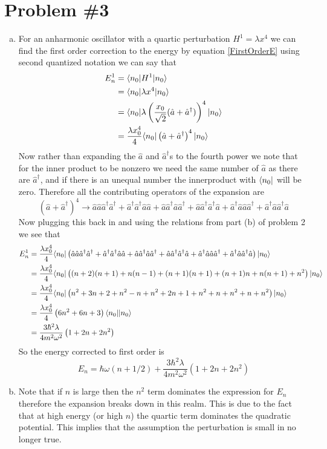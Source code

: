 \documentclass[11pt]{article}
\numberwithin{equation}{section}
\begin{document}
\section{Problem \#3}
\begin{enumerate}[(a)]
\item
For an anharmonic oscillator with a quartic perturbation $H^1 = \lambda x^4$ we can find the first order correction to the energy by equation \ref{FirstOrderE} using second quantized notation we can say that
\begin{align*}
E_n^1 &= \langle{n_0}|H^1|{n_0}\rangle\\
&= \langle{n_0}|\lambda x^4|{n_0}\rangle\\
&= \langle{n_0}|\lambda\left(\frac{x_0}{\sqrt{2}}(\hat{a}+\hat{a}^{\dagger})\right)^4|{n_0}\rangle\\
&= \frac{\lambda x_0^4}{4}\langle{n_0}|\left(\hat{a}+\hat{a}^{\dagger}\right)^4|{n_0}\rangle
\end{align*}
Now rather than expanding the $\hat{a}$ and $\hat{a}^{\dagger}$s to the fourth power we note that for the inner product to be nonzero we need the same number of $\hat{a}$ as there are $\hat{a}^{\dagger}$, and if there is an unequal number the innerproduct with $\langle{n_0}|$ will be zero. Therefore all the contributing operators of the expansion are
$$\left(\hat{a}+\hat{a}^{\dagger}\right)^4 \rightarrow \hat{a}\hat{a}\hat{a}^{\dagger}\hat{a}^{\dagger} + \hat{a}^{\dagger}\hat{a}^{\dagger}\hat{a}\hat{a} + \hat{a}\hat{a}^{\dagger}\hat{a}\hat{a}^{\dagger} + \hat{a}\hat{a}^{\dagger}\hat{a}^{\dagger}\hat{a} + \hat{a}^{\dagger}\hat{a}\hat{a}\hat{a}^{\dagger} + \hat{a}^{\dagger}\hat{a}\hat{a}^{\dagger}\hat{a}$$
Now plugging this back in and using the relations from part (b) of problem 2 we see that
\begin{align*}
E_n^1 &= \frac{\lambda x_0^4}{4}\langle{n_0}|\left(\hat{a}\hat{a}\hat{a}^{\dagger}\hat{a}^{\dagger} + \hat{a}^{\dagger}\hat{a}^{\dagger}\hat{a}\hat{a} + \hat{a}\hat{a}^{\dagger}\hat{a}\hat{a}^{\dagger} + \hat{a}\hat{a}^{\dagger}\hat{a}^{\dagger}\hat{a} + \hat{a}^{\dagger}\hat{a}\hat{a}\hat{a}^{\dagger} + \hat{a}^{\dagger}\hat{a}\hat{a}^{\dagger}\hat{a}\right)|{n_0}\rangle\\
&= \frac{\lambda x_0^4}{4}\langle{n_0}|\left((n+2)(n+1)+n(n-1)+(n+1)(n+1)+(n+1)n+n(n+1)+n^2\right)|{n_0}\rangle\\
&= \frac{\lambda x_0^4}{4}\langle{n_0}|\left(n^2+3n+2+n^2-n+n^2+2n+1+n^2+n+n^2+n+n^2\right)|{n_0}\rangle\\
&= \frac{\lambda x_0^4}{4}\left(6n^2+6n+3\right)\langle{n_0}||{n_0}\rangle\\
&= \frac{3\hbar^2\lambda}{4m^2\omega^2}\left(1+2n+2n^2\right)
\end{align*}
So the energy corrected to first order is
$$E_n = \hbar\omega(n+1/2) + \frac{3\hbar^2\lambda}{4m^2\omega^2}\left(1+2n+2n^2\right)$$

\item
Note that if $n$ is large then the $n^2$ term dominates the expression for $E_n$ therefore the expansion breaks down in this realm. This is due to the fact that at high energy (or high $n$) the quartic term dominates the quadratic potential. This implies that the assumption the perturbation is small in no longer true.
\end{enumerate}
\end{document}
